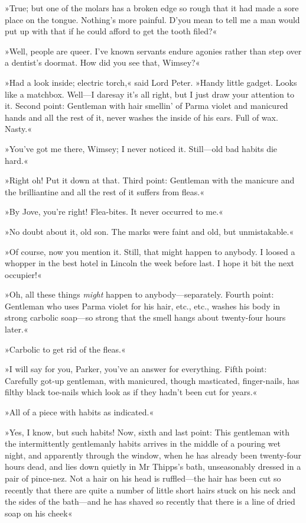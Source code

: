 »True; but one of the molars has a broken edge so rough that it had made a sore place on the tongue. Nothing's more painful. D'you mean to tell me a man would put up with that if he could afford to get the tooth filed?«

»Well, people are queer. I've known servants endure agonies rather than step over a dentist's doormat. How did you see that, Wimsey?«

»Had a look inside; electric torch,« said Lord Peter. »Handy little gadget. Looks like a matchbox. Well\allowbreak---\allowbreak I daresay it's all right, but I just draw your attention to it. Second point: Gentleman with hair smellin' of Parma violet and manicured hands and all the rest of it, never washes the inside of his ears. Full of wax. Nasty.«

»You've got me there, Wimsey; I never noticed it. Still\allowbreak---\allowbreak old bad habits die hard.«

»Right oh! Put it down at that. Third point: Gentleman with the manicure and the brilliantine and all the rest of it suffers from fleas.«

»By Jove, you're right! Flea-bites. It never occurred to me.«

»No doubt about it, old son. The marks were faint and old, but unmistakable.«

»Of course, now you mention it. Still, that might happen to anybody. I loosed a whopper in the best hotel in Lincoln the week before last. I hope it bit the next occupier!«

»Oh, all these things \textit{might} happen to anybody\allowbreak---\allowbreak separately. Fourth point: Gentleman who uses Parma violet for his hair, etc., etc., washes his body in strong carbolic soap\allowbreak---\allowbreak so strong that the smell hangs about twenty-four hours later.«

»Carbolic to get rid of the fleas.«

»I will say for you, Parker, you've an answer for everything. Fifth point: Carefully got-up gentleman, with manicured, though masticated, finger-nails, has filthy black toe-nails which look as if they hadn't been cut for years.«

»All of a piece with habits as indicated.«

»Yes, I know, but such habits! Now, sixth and last point: This gentleman with the intermittently gentlemanly habits arrives in the middle of a pouring wet night, and apparently through the window, when he has already been twenty-four hours dead, and lies down quietly in Mr Thipps's bath, unseasonably dressed in a pair of pince-nez. Not a hair on his head is ruffled\allowbreak---\allowbreak the hair has been cut so recently that there are quite a number of little short hairs stuck on his neck and the sides of the bath\allowbreak---\allowbreak and he has shaved so recently that there is a line of dried soap on his cheek\longdash«

